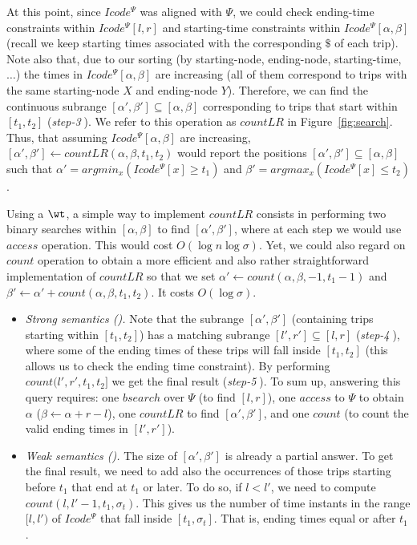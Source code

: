 \begin{itemize}[leftmargin=3mm]
	At this point, since $Icode^{\Psi}$  was aligned with $\Psi$, 
	we could check ending-time constraints within $Icode^{\Psi}[l,r]$  and starting-time constraints 
	within $Icode^{\Psi}[\alpha,\beta]$ (recall we keep starting times associated with the corresponding $\$$ of each trip).
	Note also that, due to our sorting (by starting-node, ending-node, starting-time,$\dots$) the times in $Icode^{\Psi}[\alpha,\beta]$ are 
	increasing (all of them correspond to trips with the same starting-node $X$ and ending-node $Y$). Therefore,
	we can find the continuous subrange $[\alpha',\beta'] \subseteq [\alpha,\beta] $ corresponding to trips
	that start within $[t_1, t_2]$ ({\em step-\textcircled{3}}). We refer to this operation as $countLR$ in Figure~\ref{fig:search}.
	Thus, that assuming $Icode^{\Psi}[\alpha,\beta]$ are increasing,  
	$[\alpha',\beta'] \leftarrow countLR(\alpha,\beta,t_1,t_2)$ would report the 
	positions $[\alpha',\beta'] \subseteq [\alpha,\beta]$ such that $\alpha' = argmin_{x} (Icode^{\Psi}[x] \geq t_1)$ and
	$\beta' = argmax_{x} (Icode^{\Psi}[x] \leq t_2)$.
	
	Using a $\wt$, a simple way to implement $countLR$  consists in performing  two binary searches within 
	$[\alpha,\beta]$ to find $[\alpha',\beta']$, where at each step we would use $access$ operation. This would cost $O(\log n \log \sigma)$. 
	Yet, we could also regard on $count$ operation to obtain a more efficient and also rather straightforward 
	implementation of $countLR$ so that we set $\alpha' \leftarrow count(\alpha,\beta,-1,t_1-1)$ and
	$\beta' \leftarrow \alpha'+ count(\alpha,\beta,t_1,t_2)$. It costs $O(\log\sigma)$.
	
	
	\begin{itemize}
		\item {\em Strong semantics (\Tfxtys).} Note that the subrange $[\alpha',\beta']$ (containing trips starting within $[t_1,t_2]$) 
		has a matching subrange $[l',r'] \subseteq [l,r]$ ({\em step-\textcircled{4}}), where some of the ending times of these trips will fall inside 
		$[t_1, t_2]$ (this allows us to check the ending time constraint). By performing  $count(l',r',t_1,t_2]$  we get the final result 
		({\em step-\textcircled{5}}). 
		To sum up, answering this query  requires: one $bsearch$ over $\Psi$ (to find $[l,r]$), one $access$ to $\Psi$ to obtain
		 $\alpha$ ($\beta\leftarrow \alpha+r-l$), one $countLR$ to find $[\alpha',\beta']$, and one $count$ 
		 (to count the valid ending times in $[l',r']$).
		
		
		\item {\em Weak semantics (\Tfxtyw).}
		The size of $[\alpha',\beta']$ is already a partial answer. To get the final result, we need to add 
		also the occurrences of those trips starting before $t_1$ that end at $t_1$ or later. 
		To do so, if $l<l'$, we need to compute $count(l,l'-1, t_1, {\sigma_t})$. This gives us the number of time 
		instants in the range $[l,l')$ of  $Icode^{\Psi}$ that fall inside $[t_1, {\sigma_t}]$. 
		That is, ending times equal or after $t_1$.
	\end{itemize}
	

\end{itemize}

